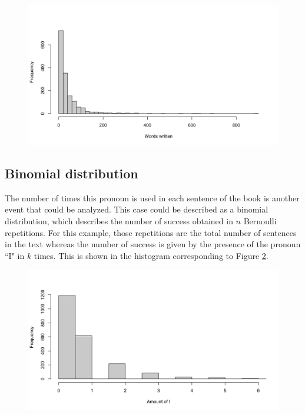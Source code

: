 \documentclass[10pt,leter,openany]{article}
\begin{document}
		\begin{figure}
		\begin{center}
			\includegraphics[scale=0.3]{img/words_forI}
			\label{fig:wordsforI}
		\end{center}
	\end{figure}

\subsection{Binomial distribution}

	The number of times this pronoun is used in each sentence of the book is another event that could be analyzed. This case could be described as a binomial distribution, which describes the number of success obtained in $ n  $ Bernoulli repetitions. For this example, those repetitions are the total number of sentences in the text whereas the number of success is given by the presence of the pronoun ``I" in $ k $ times. This is shown in the histogram corresponding to Figure \ref{fig:numberofI}. 
	
	\begin{figure}
	\begin{center}
		\includegraphics[scale=0.3]{img/number_of_I}
		\label{fig:numberofI}
	\end{center}
\end{figure}
\end{document}

